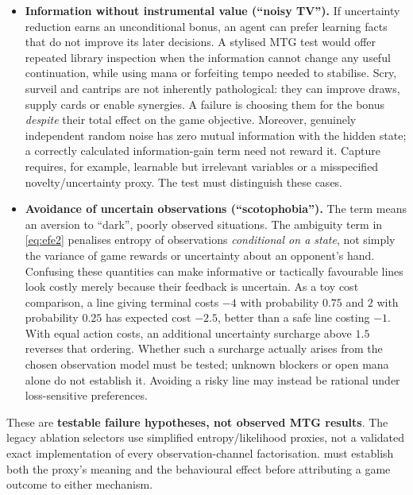 \documentclass[11pt,a4paper]{article}
\theoremstyle{definition}
\theoremstyle{plain}
\begin{document}
\begin{itemize}[leftmargin=1.2em, itemsep=2pt]
  \item \textbf{Information without instrumental value (``noisy TV'').}
  If uncertainty reduction earns an unconditional bonus, an agent can prefer learning facts that do not improve its later decisions. A stylised MTG test would offer repeated library inspection when the information cannot change any useful continuation, while using mana or forfeiting tempo needed to stabilise. Scry, surveil and cantrips are not inherently pathological: they can improve draws, supply cards or enable synergies. A failure is choosing them for the bonus \emph{despite} their total effect on the game objective. Moreover, genuinely independent random noise has zero mutual information with the hidden state; a correctly calculated information-gain term need not reward it. Capture requires, for example, learnable but irrelevant variables or a misspecified novelty/uncertainty proxy. The test must distinguish these cases.
  \item \textbf{Avoidance of uncertain observations (``scotophobia'').}
  The term means an aversion to ``dark'', poorly observed situations. The ambiguity term in \eqref{eq:efe2} penalises entropy of observations \emph{conditional on a state}, not simply the variance of game rewards or uncertainty about an opponent's hand. Confusing these quantities can make informative or tactically favourable lines look costly merely because their feedback is uncertain. As a toy cost comparison, a line giving terminal costs $-4$ with probability $0.75$ and $2$ with probability $0.25$ has expected cost $-2.5$, better than a safe line costing $-1$. With equal action costs, an additional uncertainty surcharge above $1.5$ reverses that ordering. Whether such a surcharge actually arises from the chosen observation model must be tested; unknown blockers or open mana alone do not establish it. Avoiding a risky line may instead be rational under loss-sensitive preferences.
\end{itemize}

These are \textbf{testable failure hypotheses, not observed MTG results}. The legacy ablation selectors use simplified entropy/likelihood proxies, not a validated exact implementation of every observation-channel factorisation.  must establish both the proxy's meaning and the behavioural effect before attributing a game outcome to either mechanism.
\end{document}

